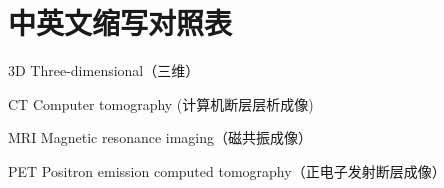 \newenvironment{abbreviation}{
    \noindent\begin{list}{}
                {\renewcommand\makelabel[1]{##1\hfil}
                \setlength{\labelwidth}{2.5cm} %
                \setlength{\labelsep}{0.5cm} %
                \setlength{\itemindent}{0cm} %
                \setlength{\leftmargin}{\labelwidth+\labelsep} %
                \setlength{\rightmargin}{0cm}
                \setlength{\parsep}{0cm} %
                \setlength{\itemsep}{0cm} %
                \setlength{\listparindent}{0cm} %
                \setlength{\topsep}{0cm} %
    }}
    {\end{list}}

\chapter{中英文缩写对照表}
\vspace*{-0.8cm}

\begin{abbreviation}
    \item[3D] Three-dimensional（三维）
    \item[CT] Computer tomography (计算机断层层析成像)
    \item[MRI] Magnetic resonance imaging（磁共振成像）
    \item[PET] Positron emission computed tomography（正电子发射断层成像）
\end{abbreviation}